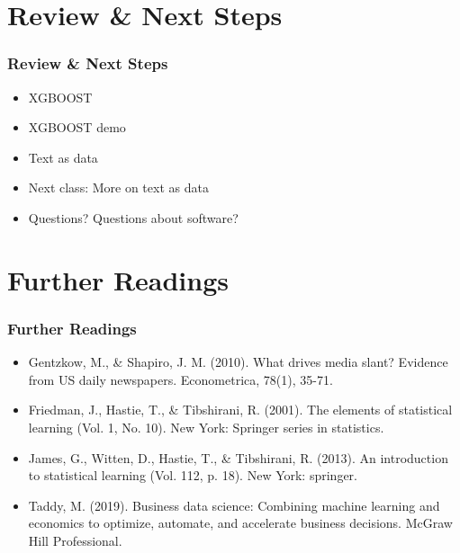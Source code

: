 \documentclass[
  shownotes,
  xcolor={svgnames},
  hyperref={colorlinks,citecolor=DarkBlue,linkcolor=DarkRed,urlcolor=DarkBlue}
  , aspectratio=169]{beamer}
\begin{document}
\section{Review
 \& Next Steps}
\begin{frame}
\frametitle{Review \& Next Steps}
  
\begin{itemize} 
   \item XGBOOST
   \bigskip
   \item XGBOOST demo
   \bigskip
  \item Text as data
    \bigskip  
  \item  Next class:  More on text as data


\bigskip  
\item Questions? Questions about software? 

\end{itemize}
\end{frame}

\section{Further Readings}
\begin{frame}
\frametitle{Further Readings}

\begin{itemize}

  \item Gentzkow, M., \& Shapiro, J. M. (2010). What drives media slant? Evidence from US daily newspapers. Econometrica, 78(1), 35-71.
  \medskip
  \item Friedman, J., Hastie, T., \& Tibshirani, R. (2001). The elements of statistical learning (Vol. 1, No. 10). New York: Springer series in statistics.
  \medskip
  \item James, G., Witten, D., Hastie, T., \& Tibshirani, R. (2013). An introduction to statistical learning (Vol. 112, p. 18). New York: springer.
  \medskip
  \item Taddy, M. (2019). Business data science: Combining machine learning and economics to optimize, automate, and accelerate business decisions. McGraw Hill Professional.

  
\end{itemize}

\end{frame}
\end{document}

